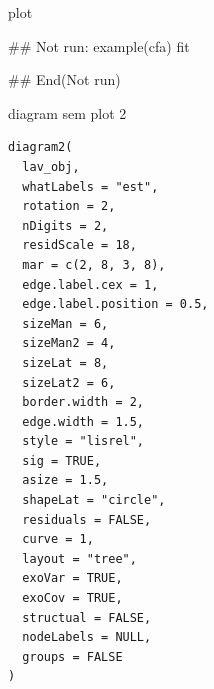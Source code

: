 \documentclass[a4paper]{book}
\begin{document}
%
\begin{Value}
plot
\end{Value}
%
\begin{Examples}
\begin{ExampleCode}

## Not run: 
example(cfa)
fit %


## End(Not run)

\end{ExampleCode}
\end{Examples}
%
\begin{Description}
diagram sem plot 2
\end{Description}
%
\begin{Usage}
\begin{verbatim}
diagram2(
  lav_obj,
  whatLabels = "est",
  rotation = 2,
  nDigits = 2,
  residScale = 18,
  mar = c(2, 8, 3, 8),
  edge.label.cex = 1,
  edge.label.position = 0.5,
  sizeMan = 6,
  sizeMan2 = 4,
  sizeLat = 8,
  sizeLat2 = 6,
  border.width = 2,
  edge.width = 1.5,
  style = "lisrel",
  sig = TRUE,
  asize = 1.5,
  shapeLat = "circle",
  residuals = FALSE,
  curve = 1,
  layout = "tree",
  exoVar = TRUE,
  exoCov = TRUE,
  structual = FALSE,
  nodeLabels = NULL,
  groups = FALSE
)
\end{verbatim}
\end{Usage}
%
\end{document}
